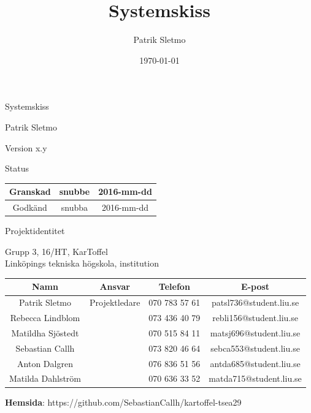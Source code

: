 \documentclass{article}
\title{Systemskiss}
\author{Patrik Sletmo}
\date{\today}
\begin{document}
\thispagestyle{empty}

{
\sffamily
\centering
\large


{\huge 
Systemskiss
}

{\large
Patrik Sletmo
}

{\large
Version x.y
}

\vspace{3.5cm}

Status
\begin{center}
\begin{tabular}{ | c | c | c | } 
\hline
Granskad & snubbe & 2016-mm-dd \\
\hline
Godkänd & snubba & 2016-mm-dd\\
\hline
\end{tabular}
\end{center}
}
\clearpage

\vspace*{\fill}
{
\sffamily
\centering
\large


{\huge
Projektidentitet
}

{\large
Grupp 3, 16/HT, KarToffel \\ Linköpings tekniska högskola, institution
}

\vspace{0.5cm}

\begin{table}[H]
\centering
\begin{tabular}{ | c | c | c | c |}
\hline
Namn & Ansvar & Telefon & E-post \\
\hline
Patrik Sletmo & Projektledare & 070 783 57 61 & patsl736@student.liu.se \\
\hline
Rebecca Lindblom &  & 073 436 40 79 & rebli156@student.liu.se \\
\hline
Matildha Sjöstedt &  & 070 515 84 11 & matsj696@student.liu.se \\
\hline
Sebastian Callh &  & 073 820 46 64 & sebca553@student.liu.se \\
\hline
Anton Dalgren &  & 076 836 51 56 & antda685@student.liu.se \\
\hline
Matilda Dahlström &  & 070 636 33 52 & matda715@student.liu.se \\
\hline
\end{tabular}
\end{table}
}

\begin{center}
\textbf{Hemsida}: https://github.com/SebastianCallh/kartoffel-tsea29
\end{center}
\end{document}
